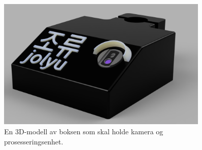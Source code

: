 \begin{figure}[!htbp]
\centering
\begin{minipage}[c]{0.45\textwidth}
\centering
    \includegraphics[width=0.9\textwidth]{implementering/Boks_render.png}
    \caption{En 3D-modell av boksen som skal holde kamera og prosesseringsenhet.}
    \label{fig:boks}
    

\end{minipage}
\end{figure}
